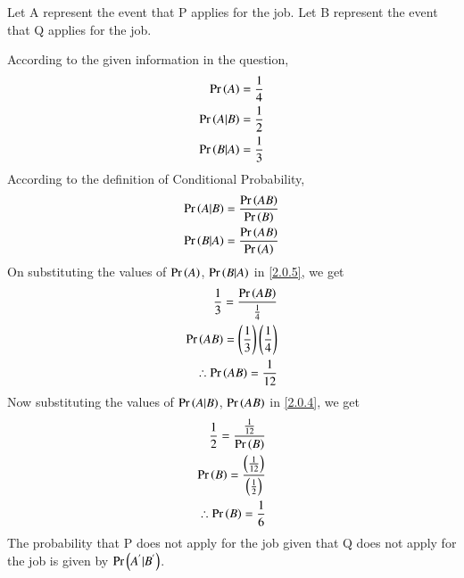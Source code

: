 Let A represent the event that P applies for the job. Let B represent the event that Q applies for the job. 

According to the given information in the question,
\begin{align}
\Pr\left(A\right) = \frac{1}{4} \\
\Pr\left(A|B\right) = \frac{1}{2} \\
\Pr\left(B|A\right) = \frac{1}{3} 
\end{align}
According to the definition of Conditional Probability,
\begin{align}
\pr{A|B} = \frac{\pr{AB}}{\pr{B}} \label{2.0.4} \\
\pr{B|A} = \frac{\pr{AB}}{\pr{A}} \label{2.0.5}
\end{align}
On substituting the values of $\Pr\left(A\right)$, $\Pr\left(B|A\right)$ in \eqref{2.0.5}, we get
\begin{align}
\frac{1}{3} = \frac{\Pr\left(AB\right)}{\frac{1}{4}} \\
\Pr\left(AB\right) = \left(\frac{1}{3} \right) \left(\frac{1}{4} \right) \\
\therefore \Pr\left(AB\right) = \frac{1}{12}
\end{align}
Now substituting the values of $\Pr\left(A|B\right)$, $\Pr\left(AB\right)$ in \eqref{2.0.4}, we get
\begin{align}
\frac{1}{2} = \frac{\frac{1}{12}}{\Pr\left(B\right)} \\
\Pr\left(B\right) = \frac{\left(\frac{1}{12} \right)}{\left(\frac{1}{2} \right)} \\
\therefore \Pr\left(B\right) = \frac{1}{6}
\end{align}
The probability that P does not apply for the job given that Q does not apply for the job is given by $\Pr\left(A^{'}|B^{'}\right)$.

